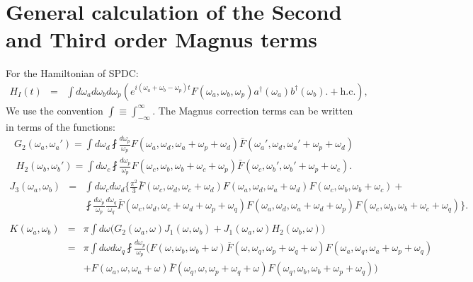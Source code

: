 \documentclass[10pt,letterpaper]{article}
\newcommand{\hc}{\text{h.c.}}
\begin{document}
\section{General calculation of the Second and Third order Magnus terms}
For the Hamiltonian of SPDC:
\begin{eqnarray}
H_I(t)&=& \int d\omega_a d\omega_b d\omega_p \left( e^{i (\omega_a+\omega_b-\omega_p)  t} F\left(\omega _a,\omega _b,\omega _p\right) a^\dagger (\omega _a)b^\dagger (\omega _b).+ \hc  \right),
\end{eqnarray}
We use the convention $\int \equiv \int_{-\infty}^{\infty}$. The Magnus correction terms can be written in terms of the functions:
\begin{eqnarray}\label{g2}
G_2(\omega_a,\omega_a') =  \int   d\omega_{d} \fint  \frac{d\omega_p}{\omega_p} F\left(\omega_a,\omega _d,\omega _a+\omega _p+ \omega _d \right) \bar{F}\left(\omega _a',\omega _d,\omega _a'+\omega _p+\omega _d\right) \nonumber
\end{eqnarray}
\begin{eqnarray}\label{h2}
H_2(\omega_b,\omega_b')=  \int   d\omega_c \fint \frac{d\omega_p}{\omega_p} F\left(\omega _c,\omega _b,\omega _b+\omega_c+\omega _p\right) \bar{F}\left(\omega _c,\omega _b',\omega  _b'+\omega _p+\omega_c\right). \nonumber
\end{eqnarray}
\begin{eqnarray}\label{J_3}
J_3(\omega_a,\omega_b)&=&\int  d\omega_c d\omega_d \Big\{ \frac{\pi^2}{3} 
\bar{F}\left(\omega _c,\omega _d,\omega _c+\omega _d\right)  F\left(\omega _a,\omega _d,\omega _a+\omega _d\right) F\left(\omega _c,\omega _b,\omega _b+\omega_c\right)+ \nonumber\\
&&\fint  \frac{d \omega_p}{\omega_p} \frac{d \omega_q}{\omega_q}  \bar{F}\left(\omega _c,\omega _d,\omega _c+\omega _d+\omega _p+\omega _q\right)  F\left(\omega _a,\omega _d,\omega _a+\omega _d+\omega _p\right) F\left(\omega _c,\omega _b,\omega _b+\omega_c+\omega _q\right)  \Big\}. \nonumber\\
\end{eqnarray}
\begin{eqnarray}
K(\omega_a,\omega_b)&=& \pi  \int d \omega \Big(G_2\left(\omega _a,\omega \right) J_1\left(\omega ,\omega _b\right)+J_1\left(\omega _a,\omega \right) H_2\left(\omega _b,\omega \right)  \Big)\\
&=& \pi \int d \omega d \omega_q \fint \frac{d \omega_p}{\omega_p} \Big(F\left(\omega ,\omega _b,\omega _b+\omega
   \right) \bar{F}\left(\omega ,\omega _q,\omega
   _p+\omega _q+\omega \right) F\left(\omega
   _a,\omega _q,\omega _a+\omega _p+\omega
   _q\right)\nonumber \\
&&+F\left(\omega _a,\omega ,\omega
   _a+\omega \right) \bar{F}\left(\omega _q,\omega
   ,\omega _p+\omega _q+\omega \right)
   F\left(\omega _q,\omega _b,\omega _b+\omega
   _p+\omega _q\right) \Big)
\end{eqnarray}
\end{document}
